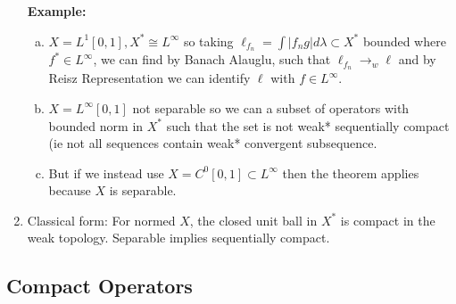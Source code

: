 \documentclass{article}
\begin{document}
\begin{enumerate}
    \textbf{Example:}
    \begin{enumerate} [a.]
        \item \(X = L^1[0,1], X^* \cong L^\infty\) so taking \(\ell_{f_n} = \int |f_ng|d\lambda \subset X^*\) bounded where \(f^* \in L^\infty\), we can find by Banach Alauglu, such that \(\ell_{f_n} \to_w \ell\) and by Reisz Representation we can identify \(\ell\) with \(f \in L^\infty\).
        \item \(X = L^\infty[0,1]\) not separable so we can a subset of operators with bounded norm in \(X^*\) such that the set is not weak* sequentially compact (ie not all sequences contain weak* convergent subsequence.
        \item But if we instead use \(X = C^0[0,1] \subset L^\infty\) then the theorem applies because \(X\) is separable.
    \end{enumerate}

    \item Classical form: For normed \(X\), the closed unit ball in \(X^*\) is compact in the weak topology. Separable implies sequentially compact.
\end{enumerate}

\subsection*{Compact Operators}
\end{document}
